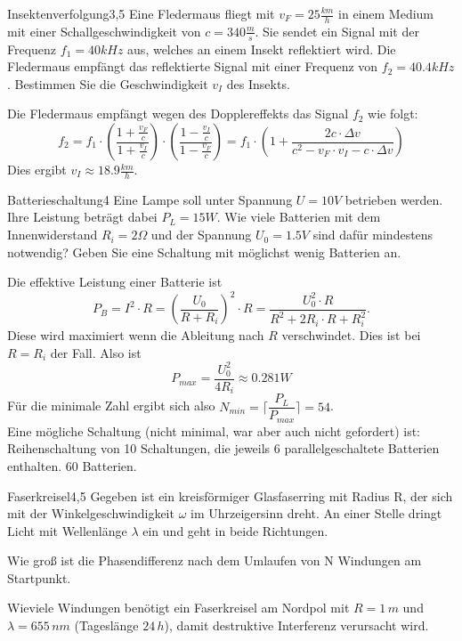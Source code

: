 


\begin{problem}{Insektenverfolgung}{3,5}
Eine Fledermaus fliegt mit $v_F=25\unit{\frac{km}{h}}$ in einem Medium mit einer Schallgeschwindigkeit von $c=340\unit{\frac{m}{s}}$.
Sie sendet ein Signal mit der Frequenz $f_1=40\unit{kHz}$ aus, welches an einem Insekt reflektiert wird. Die Fledermaus empfängt das reflektierte Signal mit einer Frequenz von $f_2=40.4\unit{kHz}$. Bestimmen Sie die Geschwindigkeit $v_I$ des Insekts.
\begin{solution}
Die Fledermaus empfängt wegen des Dopplereffekts das Signal $f_2$ wie folgt:
\[
f_2=f_1\cdot \left(\dfrac{1+\frac{v_F}{c}}{1+\frac{v_I}{c}}\right)\cdot \left(\dfrac{1-\frac{v_I}{c}}{1-\frac{v_F}{c}}\right)=f_1\cdot \left(1+\dfrac{2c\cdot \Delta v}{c^2-v_F\cdot v_I-c\cdot \Delta v}\right)
\]
Dies ergibt $v_I\approx 18.9\unit{\frac{km}{h}}$.
\end{solution}
\end{problem}

\begin{problem}{Batterieschaltung}{4}
Eine Lampe soll unter Spannung $U=10\unit{V}$ betrieben werden. Ihre Leistung beträgt dabei $P_L=15\unit{W}$.
Wie viele Batterien mit dem Innenwiderstand $R_i=2\unit{\Omega}$ und der Spannung $U_0=1.5\unit{V}$ sind dafür mindestens notwendig? Geben Sie eine Schaltung mit möglichst wenig Batterien an.
\begin{solution}
Die effektive Leistung einer Batterie ist
\[
P_B=I^2\cdot R=\left(\dfrac{U_0}{R+R_i}\right)^2\cdot R=\dfrac{U_0^2\cdot R}{R^2+2R_i\cdot R+R_i^2}.
\]
Diese wird maximiert wenn die Ableitung nach $R$ verschwindet. Dies ist bei $R=R_{i}$ der Fall.
Also ist
\[
P_{max}=\dfrac{U_0^2}{4R_i}\approx 0.281 \unit{W}
\]
Für die minimale Zahl ergibt sich also $N_{min}=\lceil\dfrac{P_L}{P_{max}}\rceil=54$.\\
Eine mögliche Schaltung (nicht minimal, war aber auch nicht gefordert) ist:
Reihenschaltung von 10 Schaltungen, die jeweils 6 parallelgeschaltete Batterien enthalten. 60 Batterien.
\end{solution}
\end{problem}

\begin{problem}{Faserkreisel}{4,5}
Gegeben ist ein kreisförmiger Glasfaserring mit Radius R, der sich mit der Winkelgeschwindigkeit $\omega$ im Uhrzeigersinn dreht.
An einer Stelle dringt Licht mit Wellenlänge $\lambda$ ein und geht in beide Richtungen.
\begin{abcenum}
\item Wie groß ist die Phasendifferenz nach dem Umlaufen von N Windungen am Startpunkt.
\item Wieviele Windungen benötigt ein Faserkreisel am Nordpol mit $R=1\,m$ und $\lambda= 655\,nm$ (Tageslänge $24\,h$), damit destruktive Interferenz verursacht wird.
\end{abcenum}
\end{problem}

